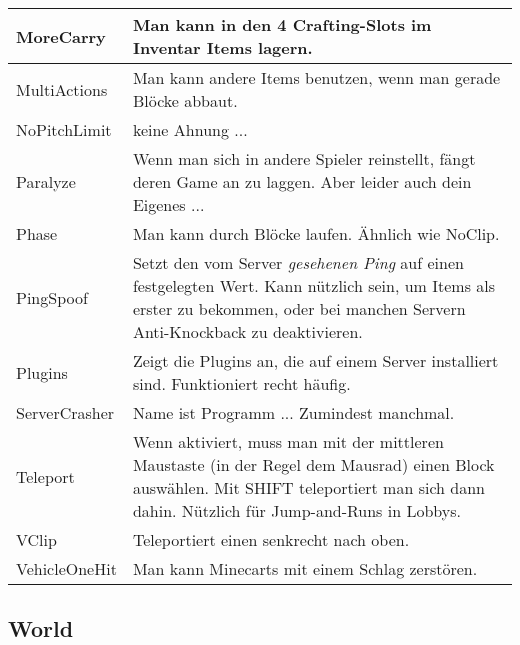 \begin{longtable}{p{3cm}|p{10cm}}
\hline
MoreCarry & Man kann in den 4 Crafting-Slots im Inventar Items lagern. \\
\hline
MultiActions & Man kann andere Items benutzen, wenn man gerade Blöcke abbaut. \\
\hline
NoPitchLimit & keine Ahnung ... \\
\hline
Paralyze & Wenn man sich in andere Spieler reinstellt, fängt deren Game an zu laggen. Aber leider auch dein Eigenes ... \\
\hline
Phase & Man kann durch Blöcke laufen. Ähnlich wie NoClip. \\
\hline
PingSpoof & Setzt den vom Server \textit{gesehenen Ping} auf einen festgelegten Wert. Kann nützlich sein, um Items als erster zu bekommen, oder bei manchen Servern Anti-Knockback zu deaktivieren. \\
\hline
\rowcolor{lime!50}Plugins & Zeigt die Plugins an, die auf einem Server installiert sind. Funktioniert recht häufig. \\
\hline
ServerCrasher & Name ist Programm ... Zumindest manchmal. \\
\hline
Teleport & Wenn aktiviert, muss man mit der mittleren Maustaste (in der Regel dem Mausrad) einen Block auswählen. Mit SHIFT teleportiert man sich dann dahin. Nützlich für Jump-and-Runs in Lobbys. \\
\hline
VClip & Teleportiert einen senkrecht nach oben. \\
\hline
VehicleOneHit & Man kann Minecarts mit einem Schlag zerstören. \\
\end{longtable}

\subsection{World}

